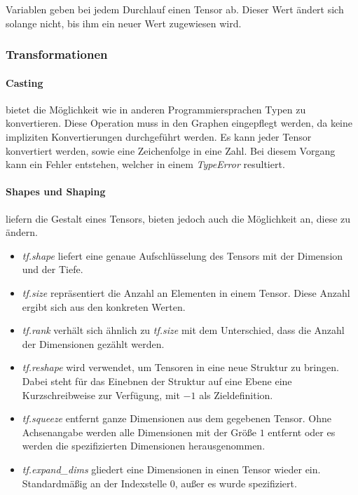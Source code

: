 Variablen geben bei jedem Durchlauf einen Tensor ab.
Dieser Wert ändert sich solange nicht, bis ihm ein neuer Wert zugewiesen wird. 

\subsubsection{Transformationen}

\paragraph{Casting} bietet die Möglichkeit wie in anderen Programmiersprachen Typen zu konvertieren. 
Diese Operation muss in den Graphen eingepflegt werden, da keine impliziten Konvertierungen durchgeführt werden. 
Es kann jeder Tensor konvertiert werden, sowie eine Zeichenfolge in eine Zahl. 
Bei diesem Vorgang kann ein Fehler entstehen, welcher in einem \textit{TypeError} resultiert.

\paragraph{Shapes und Shaping} liefern die Gestalt eines Tensors, bieten jedoch auch die Möglichkeit an, diese zu ändern. 
\begin{itemize}
	\item \textit{tf.shape} liefert eine genaue Aufschlüsselung des Tensors mit der Dimension und der Tiefe.
	\item \textit{tf.size} repräsentiert die Anzahl an Elementen in einem Tensor. 
	Diese Anzahl ergibt sich aus den konkreten Werten.
	\item \textit{tf.rank} verhält sich ähnlich zu \textit{tf.size} mit dem Unterschied, dass die Anzahl der Dimensionen gezählt werden.
	\item \textit{tf.reshape} wird verwendet, um Tensoren in eine neue Struktur zu bringen. 
	Dabei steht für das Einebnen der Struktur auf eine Ebene eine Kurzschreibweise zur Verfügung, mit $-1$ als Zieldefinition. 
	\item \textit{tf.squeeze} entfernt ganze Dimensionen aus dem gegebenen Tensor. 
	Ohne Achsenangabe werden alle Dimensionen mit der Größe $1$ entfernt oder es werden die spezifizierten Dimensionen herausgenommen.
	\item \textit{tf.expand\_dims} gliedert eine Dimensionen in einen Tensor wieder ein. 
	Standardmäßig an der Indexstelle $0$, außer es wurde spezifiziert.
\end{itemize}

